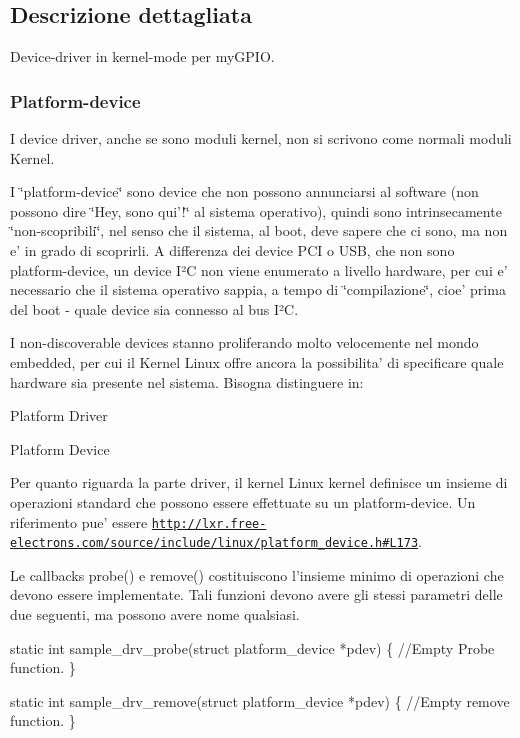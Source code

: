 \subsection{Descrizione dettagliata}
Device-\/driver in kernel-\/mode per my\+G\+P\+I\+O. 

\subsubsection*{Platform-\/device}

I device driver, anche se sono moduli kernel, non si scrivono come normali moduli Kernel.

I \char`\"{}platform-\/device\char`\"{} sono device che non possono annunciarsi al software (non possono dire \char`\"{}\+Hey,
sono qui'!\char`\"{} al sistema operativo), quindi sono intrinsecamente \char`\"{}non-\/scopribili\char`\"{}, nel senso che il sistema, al boot, deve sapere che ci sono, ma non e' in grado di scoprirli. A differenza dei device P\+C\+I o U\+S\+B, che non sono platform-\/device, un device I²\+C non viene enumerato a livello hardware, per cui e' necessario che il sistema operativo sappia, a tempo di \char`\"{}compilazione\char`\"{}, cioe' prima del boot -\/ quale device sia connesso al bus I²\+C.

I non-\/discoverable devices stanno proliferando molto velocemente nel mondo embedded, per cui il Kernel Linux offre ancora la possibilita' di specificare quale hardware sia presente nel sistema. Bisogna distinguere in\+:
\begin{DoxyItemize}
\item Platform Driver
\item Platform Device
\end{DoxyItemize}

Per quanto riguarda la parte driver, il kernel Linux kernel definisce un insieme di operazioni standard che possono essere effettuate su un platform-\/device. Un riferimento pue' essere \href{http://lxr.free-electrons.com/source/include/linux/platform_device.h#L173}{\tt http\+://lxr.\+free-\/electrons.\+com/source/include/linux/platform\+\_\+device.\+h\#\+L173}.

Le callbacks probe() e remove() costituiscono l'insieme minimo di operazioni che devono essere implementate. Tali funzioni devono avere gli stessi parametri delle due seguenti, ma possono avere nome qualsiasi.


\begin{DoxyCode}
\textcolor{keyword}{static} \textcolor{keywordtype}{int} sample\_drv\_probe(\textcolor{keyword}{struct} platform\_device *pdev) \{
        \textcolor{comment}{//Empty Probe function.}
\}

\textcolor{keyword}{static} \textcolor{keywordtype}{int} sample\_drv\_remove(\textcolor{keyword}{struct} platform\_device *pdev) \{
        \textcolor{comment}{//Empty remove function.}
\}
\end{DoxyCode}


